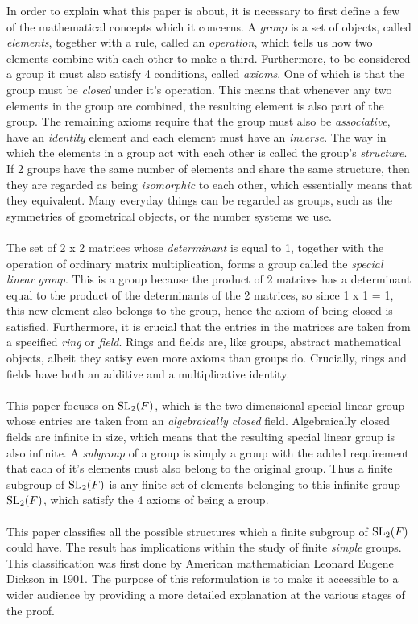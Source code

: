 In order to explain what this paper is about, it is necessary to first define a few of the mathematical concepts which it concerns. A \textit{group} is a set of objects, called \textit{elements}, together with a rule, called an \textit{operation}, which tells us how two elements combine with each other to make a third. Furthermore, to be considered a group it must also satisfy 4 conditions, called \textit{axioms}. One of which is that the group must be \textit{closed} under it's operation. This means that whenever any two elements in the group are combined, the resulting element is also part of the group. The remaining axioms require that the group must also be \textit{associative}, have an \textit{identity} element and each element must have an \textit{inverse}. The way in which the elements in a group act with each other is called the group's \textit{structure}. If 2 groups have the same number of elements and share the same structure, then they are regarded as being \textit{isomorphic} to each other, which essentially means that they equivalent. Many everyday things can be regarded as groups, such as the symmetries of geometrical objects, or the number systems we use. \\
\\
The set of 2 x 2 matrices whose \textit{determinant} is equal to 1, together with the operation of ordinary matrix multiplication, forms a group called the \textit{special linear group}. This is a group because the product of 2 matrices has a determinant equal to the product of the determinants of the 2 matrices, so since 1 x 1 = 1, this new element also belongs to the group, hence the axiom of being closed is satisfied. Furthermore, it is crucial that the entries in the matrices are taken from a specified \textit{ring} or \textit{field}. Rings and fields are, like groups, abstract mathematical objects, albeit they satisy even more axioms than groups do. Crucially, rings and fields have both an additive and a multiplicative identity. \\
\\
This paper focuses on $\operatorname{SL}_2(F)$, which is the two-dimensional special linear group whose entries are taken from an \textit{algebraically closed} field. Algebraically closed fields are infinite in size, which means that the resulting special linear group is also infinite. A \textit{subgroup} of a group is simply a group with the added requirement that each of it's elements must also belong to the original group. Thus a finite subgroup of $\operatorname{SL}_2(F)$ is any finite set of elements belonging to this infinite group $\operatorname{SL}_2(F)$, which satisfy the 4 axioms of being a group. \\
\\
This paper classifies all the possible structures which a finite subgroup of $\operatorname{SL}_2(F)$ could have. The result has implications within the study of finite \textit{simple} groups. This classification was first done by American mathematician Leonard Eugene Dickson in 1901. The purpose of this reformulation is to make it accessible to a wider audience by providing a more detailed explanation at the various stages of the proof.


